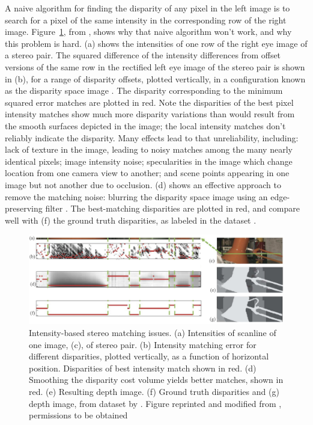 A naive algorithm for finding the disparity of any pixel in the left image is to search for a pixel of the same intensity  in the corresponding row of the right image.  Figure~\ref{fig:stereolamp}, from \cite{Hosni2013}, shows why that naive algorithm won't work, and why this problem is hard.  (a) shows the intensities of one row of the right eye image of a stereo pair. The squared difference of the intensity differences from offset versions of the same row in the rectified left eye image of the stereo pair is shown in (b), for a range of disparity offsets, plotted vertically, in a configuration known as the disparity space image \cite{Scharstein2002}.  The disparity corresponding to the minimum squared error matches are plotted in red.  Note the disparities of the best pixel intensity matches show much more disparity variations than would result from the smooth surfaces depicted in the image; the local intensity matches don't reliably indicate the disparity.  Many effects lead to that unreliability, including: lack of texture in the image, leading to noisy matches among the many nearly identical pixels; image intensity noise; specularities in the image which change location from one camera view to another; and scene points appearing in one image but not another due to occlusion. (d) shows an effective approach to remove the matching noise:  blurring the disparity space image using an edge-preserving filter \cite{Hosni2013}.  The best-matching disparities are plotted in red, and compare well with (f) the ground truth disparities, as labeled in the dataset \cite{Scharstein2002}.

\begin{figure}
    \centerline{
        \includegraphics[width=0.9\linewidth]{figures/stereo/stereolamp.jpg}}
    \caption{Intensity-based stereo matching issues. (a) Intensities of scanline of one image, (c), of stereo pair. (b) Intensity matching error for different disparities, plotted vertically, as a function of horizontal position.  Disparities of best intensity match shown in red. (d) Smoothing the disparity cost volume yields better matches, shown in red. (e) Resulting depth image.  (f) Ground truth disparities and (g) depth image, from dataset by  \cite{Scharstein2002}. Figure reprinted and modified from \cite{Hosni2013}, permissions to be obtained}
    \label{fig:stereolamp}
\end{figure}

